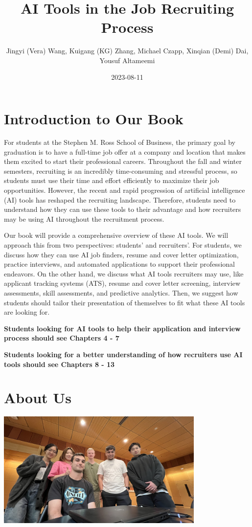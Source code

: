 \documentclass[
]{book}
\title{AI Tools in the Job Recruiting Process}
\author{Jingyi (Vera) Wang, Kuigang (KG) Zhang, Michael Czapp, Xinqian (Demi) Dai, Yousuf Altameemi}
\date{2023-08-11}
\begin{document}
\maketitle

{
\setcounter{tocdepth}{1}
\tableofcontents
}
\hypertarget{introduction-to-our-book}{%
\chapter{Introduction to Our Book}\label{introduction-to-our-book}}

For students at the Stephen M. Ross School of Business, the primary goal by graduation is to have a full-time job offer at a company and location that makes them excited to start their professional careers. Throughout the fall and winter semesters, recruiting is an incredibly time-consuming and stressful process, so students must use their time and effort efficiently to maximize their job opportunities. However, the recent and rapid progression of artificial intelligence (AI) tools has reshaped the recruiting landscape. Therefore, students need to understand how they can use these tools to their advantage and how recruiters may be using AI throughout the recruitment process.

Our book will provide a comprehensive overview of these AI tools. We will approach this from two perspectives: students' and recruiters'. For students, we discuss how they can use AI job finders, resume and cover letter optimization, practice interviews, and automated applications to support their professional endeavors. On the other hand, we discuss what AI tools recruiters may use, like applicant tracking systems (ATS), resume and cover letter screening, interview assessments, skill assessments, and predictive analytics. Then, we suggest how students should tailor their presentation of themselves to fit what these AI tools are looking for.

\textbf{Students looking for AI tools to help their application and interview process should see Chapters 4 - 7}

\textbf{Students looking for a better understanding of how recruiters use AI tools should see Chapters 8 - 13}

\hypertarget{about-us}{%
\chapter{About Us}\label{about-us}}

\includegraphics[width=4.04167in,height=\textheight]{Team Photo.jpg}
\end{document}
